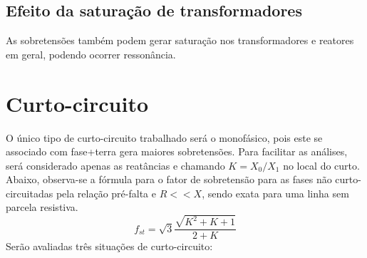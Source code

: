 \subsection{Efeito da saturação de transformadores}

As sobretensões também podem gerar saturação nos transformadores e reatores em geral, podendo ocorrer ressonância.
\newpage


\section{Curto-circuito}

O único tipo de curto-circuito trabalhado será o monofásico, pois este se associado com fase+terra gera maiores sobretensões. Para facilitar as análises, será considerado apenas as reatâncias e chamando $K = X_0/X_1$ no local do curto. Abaixo, observa-se a fórmula para o fator de sobretensão para as fases não curto-circuitadas pela relação pré-falta e $R<<X$, sendo exata para uma linha sem parcela resistiva.
\begin{equation} \label{fst}
    f_{st} = \sqrt{3}\frac{\sqrt{K^2+K+1}}{2+K}
\end{equation}
Serão avaliadas três situações de curto-circuito:
